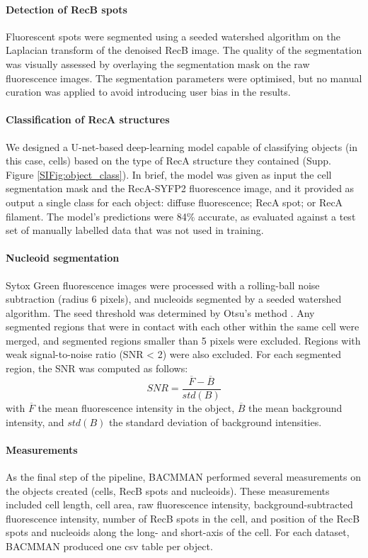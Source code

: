 \paragraph*{Detection of RecB spots}
Fluorescent spots were seg\-men\-ted using a seeded watershed algorithm on the Laplacian transform of the denoised RecB image. The quality of the segmentation was visually assessed by overlaying the segmentation mask on the raw fluorescence images. The segmentation parameters were optimised, but no manual curation was applied to avoid introducing user bias in the results.

\paragraph*{Classification of RecA structures}
We designed a U-net-based deep-learning model capable of classifying objects (in this case, cells) based on the type of RecA structure they contained (Supp. Figure \ref{SIFig:object_class}). In brief, the model was given as input the cell segmentation mask and the RecA-SYFP2 fluorescence image, and it provided as output a single class for each object: diffuse fluorescence; RecA spot; or RecA filament. The model's predictions were 84\% accurate, as evaluated against a test set of manually labelled data that was not used in training.

\paragraph*{Nucleoid segmentation}
Sytox Green fluorescence images were processed with a rolling-ball noise subtraction (radius 6 pixels), and nucleoids segmented by a seeded watershed algorithm. The seed threshold was determined by Otsu's method \cite{Otsu1979}. Any segmented regions that were in contact with each other within the same cell were merged, and segmented regions smaller than 5 pixels were excluded. Regions with weak signal-to-noise ratio (SNR < 2) were also excluded. For each segmented region, the SNR was computed as follows:
\begin{equation}
    SNR = \dfrac{\overline{F}-\overline{B}}{std(B)}
\end{equation}
with $\overline{F}$ the mean fluorescence intensity in the object, $\overline{B}$ the mean background intensity, and $std(B)$ the standard deviation of background intensities.

\paragraph*{Measurements}
As the final step of the pipeline, BACMMAN performed several measurements on the objects created (cells, RecB spots and nucleoids). These measurements included cell length, cell area, raw fluorescence intensity, background-subtracted fluorescence intensity, number of RecB spots in the cell, and position of the RecB spots and nucleoids along the long- and short-axis of the cell. For each dataset, BACMMAN produced one csv table per object.

